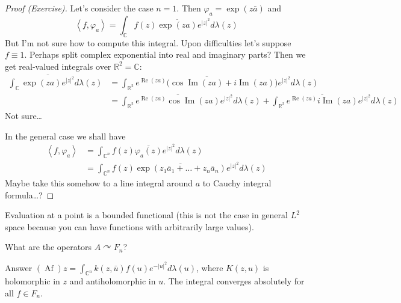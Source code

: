 \begin{proof}[Proof (Exercise)]\leavevmode
	Let's consider the case $n=1$. Then  $\varphi_a=\operatorname{exp}(z\bar{a})$ and
	\[\left<f,\varphi_a\right> =\int_{\mathbb{C}}f(z)\overline{\operatorname{exp}(za) }e^{|z|^2}d \lambda(z)\]
		{\color{2}But I'm not sure how to compute this integral. Upon difficulties let's suppose $f\equiv1$. Perhaps split complex exponential into real and imaginary parts? Then we get real-valued integrals over $\mathbb{R}^{2}=\mathbb{C}$:}
		\begin{align*}
			\int_{\mathbb{C}}\overline{\operatorname{exp}(za) e^{|z|^2}}d \lambda(z)&=\int_{\mathbb{R}^{2}}\overline{e^{\operatorname{Re}(za)}\big(\cos \operatorname{Im}(za)+i \operatorname{Im}(za)\big)}e^{|z|^2}d \lambda(z)\\
										     &= \int_{\mathbb{R}^{2}}\overline{e^{\operatorname{Re}(za)}\cos \operatorname{Im}(za)}e^{|z|^2}d \lambda(z)+\int_{\mathbb{R}^{2}}\overline{e^{\operatorname{Re}(za)}i \operatorname{Im}(za)}e^{|z|^2}d \lambda(z)
			\end{align*}
{\color{2}Not sure…}

	In the general case we shall have
	\begin{align*}\left<f,\varphi_a\right> &=\int_{\mathbb{C}^n}f(z)\overline{\varphi_a(z)}e^{|z|^2}d\lambda(z)\\
		&=\int_{\mathbb{C}^{n}}f(z)\overline{\operatorname{exp}(z_1\overline{a}_1+\ldots +z_n\overline{a}_n)}e^{|z|^2}d \lambda(z)
		\end{align*}
{\color{2}Maybe take this somehow to a line integral around $a$ to Cauchy integral formula…?} \end{proof}
\clearpage
\begin{remark}\leavevmode
	Evaluation at a point is a bounded functional (this is not the case in general  $L^2$ space because you can have functions with arbitrarily large values).
\end{remark}

\begin{question}\leavevmode
	What are the operators $A\curvearrowright F_n$?
\end{question}

\begin{thing5}{Answer}\leavevmode
	$(\operatorname{Af})z=\int_{\mathbb{C}^{n}}k(z,\bar{u})f(u)e^{-|u|^2} d \lambda(u)$, where $K(z,u)$ is holomorphic in  $z$ and antiholomorphic in $u$. The integral converges absolutely for all $f \in F_n$.
\end{thing5}

